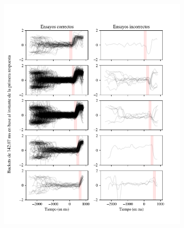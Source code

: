 \documentclass[aspectratio=169]{beamer}
\begin{document}
\begin{frame}{~}
  \begin{columns}
    \begin{column}{0.5\textwidth}
      \begin{figure}
        \centering
        \includegraphics[width=\linewidth]{img/second-disaggregated-prosaccades.png}
      \end{figure}
    \end{column}
    \begin{column}{0.5\textwidth}
      \begin{figure}
        \centering

\end{figure}
\end{column}
\end{columns}
\end{frame}
\end{document}
